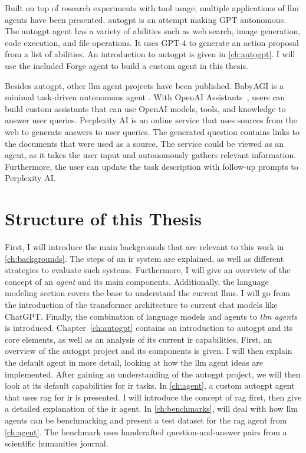 \documentclass[../main.tex]{subfiles}
\begin{document}
Built on top of research experiments with tool usage,
multiple applications of \gls{llm} agents have been presented.
\Gls{autogpt} \cite{SignificantGravitas2023} is an attempt making GPT autonomous.
The \gls{autogpt} agent has a variety of abilities such as web search,
image generation, code execution, and file operations.
It uses GPT-4 to generate an action proposal from a list of abilities.
An introduction to \gls{autogpt} is given in \autoref{ch:autogpt}.
I will use the included Forge agent to build a custom agent in this thesis.

Besides \gls{autogpt}, other \gls{llm} agent projects have been published.
BabyAGI is a minimal task-driven autonomous agent \cite{Nakajima2023}.
With OpenAI Assistants~\cite{zotero-195},
users can build custom assistants
that can use OpenAI models, tools, and knowledge to answer user queries.
Perplexity AI \cite{zotero-197} is an online service that uses sources from
the web to generate answers to user queries.
The generated question contains links to the documents that were used as a source.
The service could be viewed as an agent, as it takes the user input and autonomously
gathers relevant information.
Furthermore, the user can update the task description with follow-up prompts
to Perplexity AI.

\section{Structure of this Thesis}

First, I will introduce the main backgrounds
that are relevant to this work in \autoref{ch:backgrounds}.
The steps of an \gls{ir} system are explained, as well
as different strategies to evaluate such systems.
Furthermore, I will give an overview of the concept of an \emph{agent} and its main components.
Additionally, the language modeling section covers the base
to understand the current \glspl{llm}.
I will go from the introduction of the transformer architecture to current chat models like ChatGPT.
Finally, the combination of language models and agents to \emph{\gls{llm} agents} is introduced.
Chapter~\ref{ch:autogpt} contains an introduction to \gls{autogpt} and its core elements,
as well as an analysis of its current \gls{ir} capabilities.
First, an overview of the \gls{autogpt} project and its components is given.
I will then explain the default agent in more detail,
looking at how the \gls{llm} agent ideas are implemented.
After gaining an understanding of the \gls{autogpt} project,
we will then look at its default capabilities for \gls{ir} tasks.
In \autoref{ch:agent},
a custom \gls{autogpt} agent that uses \gls{rag} for \gls{ir} is presented.
I will introduce the concept of \gls{rag} first, then give a detailed explanation
of the \gls{ir} agent.
In \autoref{ch:benchmarks}, will deal with how \gls{llm} agents can be benchmarking
and present a test dataset for the \gls{rag} agent from \autoref{ch:agent}.
The benchmark uses handcrafted question-and-answer pairs from a scientific humanities journal.
\end{document}

